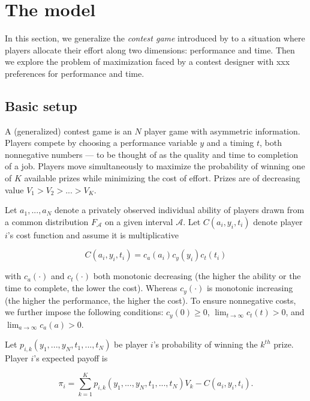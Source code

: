 \documentclass[12pt,]{article}
\begin{document}
\section{The model}\label{the-model}

In this section, we generalize the \emph{contest game} introduced by
\citet{moldovanu2001optimal} to a situation where players allocate their
effort along two dimensions: performance and time. Then we explore the
problem of maximization faced by a contest designer with xxx preferences
for performance and time.

\subsection{Basic setup}\label{basic-setup}

A (generalized) contest game is an \(N\) player game with asymmetric
information. Players compete by choosing a performance variable \(y\)
and a timing \(t\), both nonnegative numbers --- to be thought of as the
quality and time to completion of a job. Players move simultaneously to
maximize the probability of winning one of \(K\) available prizes while
minimizing the cost of effort. Prizes are of decreasing value
\(V_1>V_2>...>V_K\).

Let \(a_1, ..., a_N\) denote a privately observed individual ability of
players drawn from a common distribution \(F_{\mathcal{A}}\) on a given
interval \(\mathcal{A}\). Let \(C(a_i, y_i, t_i)\) denote player \(i\)'s
cost function and assume it is multiplicative

\begin{equation}
  C(a_i, y_i, t_i) = c_a(a_i) c_y(y_i) c_t(t_i)
\end{equation}

with \(c_a(\cdot)\) and \(c_t(\cdot)\) both monotonic decreasing (the
higher the ability or the time to complete, the lower the cost). Whereas
\(c_{y}(\cdot)\) is monotonic increasing (the higher the performance,
the higher the cost). To ensure nonnegative costs, we further impose the
following conditions: \(c_{y}(0)\geq 0\),
\(\lim_{t\rightarrow \infty}c_{t}(t)>0\), and
\(\lim_{a\rightarrow \infty}c_{a}(a)>0\).

Let \(p_{i, k}(y_1,..., y_N, t_1, ..., t_N)\) be player \(i\)'s
probability of winning the \(k^{th}\) prize. Player \(i\)'s expected
payoff is

\begin{equation}
  \label{expected payoff}
  \pi_i = \sum_{k=1}^{K} p_{i, k}(y_1,..., y_N, t_1, ..., t_N) V_k - C(a_i, y_i, t_i). 
\end{equation}
\end{document}
